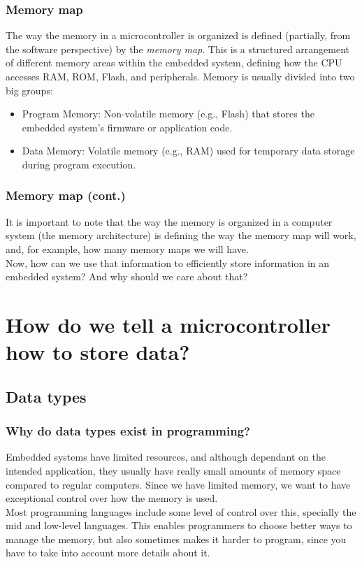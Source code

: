 \documentclass[aspectratio=169]{beamer}
\begin{document}
\begin{frame}
  \frametitle{Memory map}
  The way the memory in a microcontroller is organized is defined (partially, from the software perspective) by the \textit{memory map}. \pause
  This is a structured arrangement of different memory areas within the embedded system, defining how the CPU accesses RAM, ROM, Flash, and peripherals. \pause
  Memory is usually divided into two big groups:
  \begin{itemize}
    \item Program Memory: Non-volatile memory (e.g., Flash) that stores the embedded system's firmware or application code.
    \item Data Memory: Volatile memory (e.g., RAM) used for temporary data storage during program execution.
  \end{itemize}
\end{frame}

\begin{frame}
  \frametitle{Memory map (cont.)}
  It is important to note that the way the memory is organized in a computer system (the memory architecture) is defining the way the memory map will work, and, for example, how many memory maps we will have. \\ \pause
  Now, how can we use that information to efficiently store information in an embedded system? And why should we care about that?
\end{frame}

\section{How do we tell a microcontroller how to store data?}
\subsection{Data types}

\begin{frame}
  \frametitle{Why do data types exist in programming?}
  Embedded systems have limited resources, and although dependant on the intended application, they usually have really small amounts of memory space compared to regular computers. \pause Since we have limited memory, we want to have exceptional control over how the memory is used. \\ \pause
  Most programming languages include some level of control over this, specially the mid and low-level languages. This enables programmers to choose better ways to manage the memory, but also sometimes makes it harder to program, since you have to take into account more details about it.
\end{frame}
\end{document}
